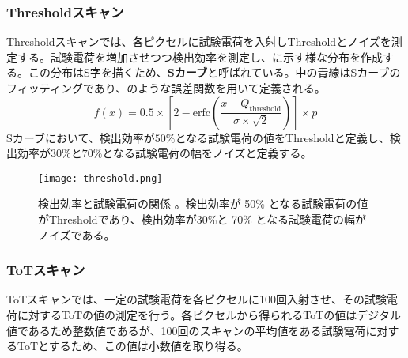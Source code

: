 \subsubsection{Thresholdスキャン}
\label{sec:thresholdscan}
Thresholdスキャンでは、各ピクセルに試験電荷を入射しThresholdとノイズを測定する。試験電荷を増加させつつ検出効率を測定し、に示す様な分布を作成する。この分布はS字を描くため、\textbf{Sカーブ}と呼ばれている。中の青線はSカーブのフィッティングであり、のような誤差関数を用いて定義される。
\begin{equation}
  \label{eq:gosakannsuu}
  f(x)=0.5\times\left[ 2-\mathrm{erfc}\left( \frac{x-Q_\mathrm{threshold}}{\sigma \times \sqrt{2}} \right)  \right] \times p
\end{equation}
Sカーブにおいて、検出効率が$50\%$となる試験電荷の値をThresholdと定義し、検出効率が$30\%$と$70\%$となる試験電荷の幅をノイズと定義する。

\begin{figure}[tbp]
  \centering
  \texttt{[image: threshold.png]}
  \caption[検出効率と試験電荷の関係]{検出効率と試験電荷の関係 \cite{calibsoft}。検出効率が 50\% となる試験電荷の値がThresholdであり、検出効率が30\%と 70\% となる試験電荷の幅がノイズである。}
  \label{fig:threshold}
\end{figure}


\subsubsection{ToTスキャン}
\label{sec:totscan}
ToTスキャンでは、一定の試験電荷を各ピクセルに100回入射させ、その試験電荷に対するToTの値の測定を行う。各ピクセルから得られるToTの値はデジタル値であるため整数値であるが、100回のスキャンの平均値をある試験電荷に対するToTとするため、この値は小数値を取り得る。


